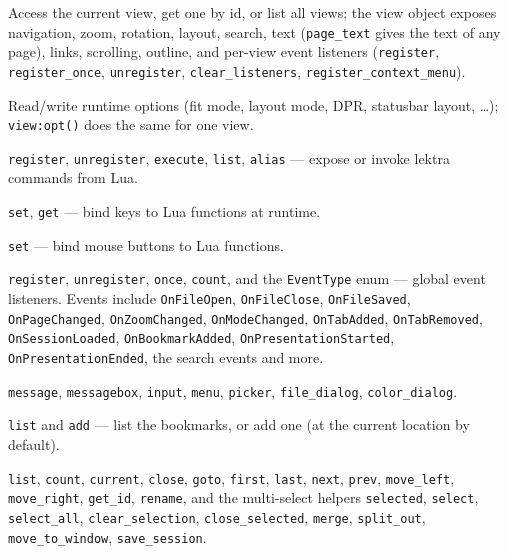 \documentclass[a4paper,12pt]{article}
\begin{document}
\begin{description}[leftmargin=0pt]
    \item[\texttt{lektra.\allowbreak{}view}] Access the current view, get one by id, or list all views; the view object exposes navigation, zoom, rotation, layout, search, text (\texttt{page\_\allowbreak{}text} gives the text of any page), links, scrolling, outline, and per-view event listeners (\texttt{register}, \texttt{register\_\allowbreak{}once}, \texttt{unregister}, \texttt{clear\_\allowbreak{}listeners}, \texttt{register\_\allowbreak{}context\_\allowbreak{}menu}).
    \item[\texttt{lektra.\allowbreak{}opt}]  Read/write runtime options (fit mode, layout mode, DPR, statusbar layout, …); \texttt{view:\allowbreak{}opt()} does the same for one view.
    \item[\texttt{lektra.\allowbreak{}cmd}]  \texttt{register}, \texttt{unregister}, \texttt{execute}, \texttt{list}, \texttt{alias} — expose or invoke lektra commands from Lua.
    \item[\texttt{lektra.\allowbreak{}keymap}] \texttt{set}, \texttt{get} — bind keys to Lua functions at runtime.
    \item[\texttt{lektra.\allowbreak{}mousemap}] \texttt{set} — bind mouse buttons to Lua functions.
    \item[\texttt{lektra.\allowbreak{}event}] \texttt{register}, \texttt{unregister}, \texttt{once}, \texttt{count}, and the \texttt{EventType} enum — global event listeners. Events include \texttt{OnFileOpen}, \texttt{OnFileClose}, \texttt{OnFileSaved}, \texttt{OnPageChanged}, \texttt{OnZoomChanged}, \texttt{OnModeChanged}, \texttt{OnTabAdded}, \texttt{OnTabRemoved}, \texttt{OnSessionLoaded}, \texttt{OnBookmarkAdded}, \texttt{OnPresentationStarted}, \texttt{OnPresentationEnded}, the search events and more.
    \item[\texttt{lektra.\allowbreak{}ui}]   \texttt{message}, \texttt{messagebox}, \texttt{input}, \texttt{menu}, \texttt{picker}, \texttt{file\_\allowbreak{}dialog}, \texttt{color\_\allowbreak{}dialog}.
    \item[\texttt{lektra.\allowbreak{}bookmarks}] \texttt{list} and \texttt{add} — list the bookmarks, or add one (at the current location by default).
    \item[\texttt{lektra.\allowbreak{}tabs}] \texttt{list}, \texttt{count}, \texttt{current}, \texttt{close}, \texttt{goto}, \texttt{first}, \texttt{last}, \texttt{next}, \texttt{prev}, \texttt{move\_\allowbreak{}left}, \texttt{move\_\allowbreak{}right}, \texttt{get\_\allowbreak{}id}, \texttt{rename}, and the multi-select helpers \texttt{selected}, \texttt{select}, \texttt{select\_\allowbreak{}all}, \texttt{clear\_\allowbreak{}selection}, \texttt{close\_\allowbreak{}selected}, \texttt{merge}, \texttt{split\_\allowbreak{}out}, \texttt{move\_\allowbreak{}to\_\allowbreak{}window}, \texttt{save\_\allowbreak{}session}.

\end{description}
\end{document}
